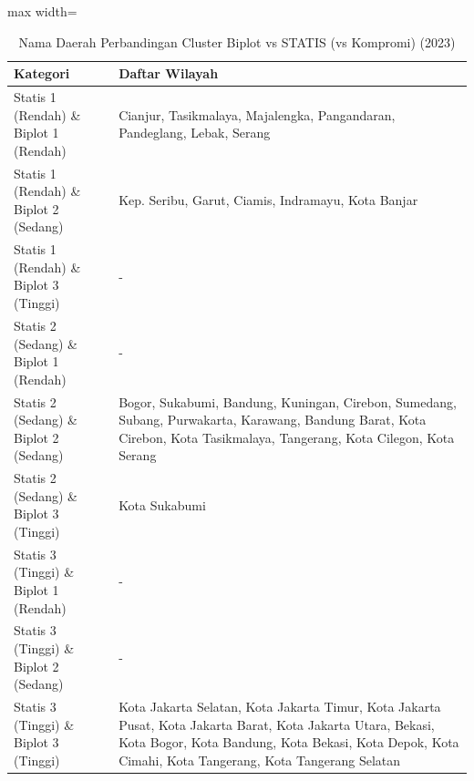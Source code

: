 \begin{table}[H]
\centering
\caption{Nama Daerah Perbandingan Cluster Biplot vs STATIS (vs Kompromi) (2023)} \label{tab:app1biplot_statis_name_2023}
\begin{adjustbox}{max width=\textwidth}
\begin{tabular}{|p{4cm}|p{10cm}|}
\hline
\textbf{Kategori} & \textbf{Daftar Wilayah} \\
\hline
Statis 1 (Rendah) \& Biplot 1 (Rendah) & Cianjur, Tasikmalaya, Majalengka, Pangandaran, Pandeglang, Lebak, Serang \\
\hline
Statis 1 (Rendah) \& Biplot 2 (Sedang) & Kep. Seribu, Garut, Ciamis, Indramayu, Kota Banjar \\
\hline
Statis 1 (Rendah) \& Biplot 3 (Tinggi) & - \\
\hline
Statis 2 (Sedang) \& Biplot 1 (Rendah) & - \\
\hline
Statis 2 (Sedang) \& Biplot 2 (Sedang) & Bogor, Sukabumi, Bandung, Kuningan, Cirebon, Sumedang, Subang, Purwakarta, Karawang, Bandung Barat, Kota Cirebon, Kota Tasikmalaya, Tangerang, Kota Cilegon, Kota Serang \\
\hline
Statis 2 (Sedang) \& Biplot 3 (Tinggi) & Kota Sukabumi \\
\hline
Statis 3 (Tinggi) \& Biplot 1 (Rendah) & - \\
\hline
Statis 3 (Tinggi) \& Biplot 2 (Sedang) & - \\
\hline
Statis 3 (Tinggi) \& Biplot 3 (Tinggi) & Kota Jakarta Selatan, Kota Jakarta Timur, Kota Jakarta Pusat, Kota Jakarta Barat, Kota Jakarta Utara, Bekasi, Kota Bogor, Kota Bandung, Kota Bekasi, Kota Depok, Kota Cimahi, Kota Tangerang, Kota Tangerang Selatan \\
\hline
\end{tabular}
\end{adjustbox}
\end{table}
